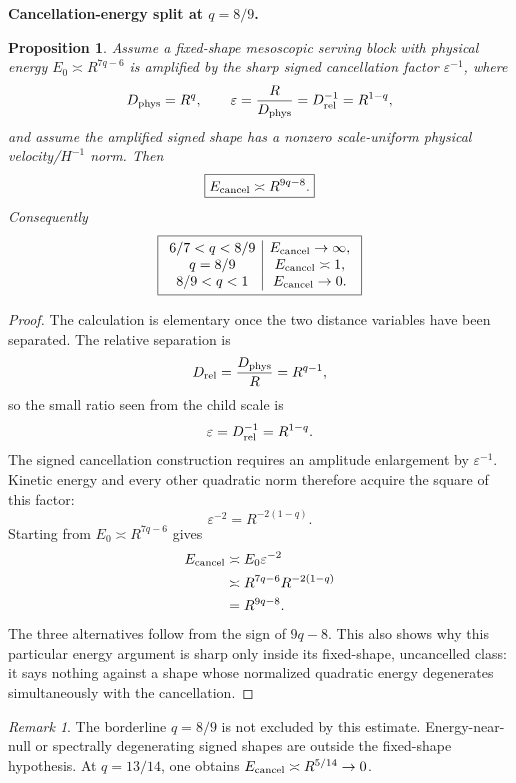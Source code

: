 \documentclass[11pt]{article}
\newtheorem{proposition}[theorem]{Proposition}
\theoremstyle{definition}\newtheorem{definition}[theorem]{Definition}
\theoremstyle{remark}\newtheorem{remark}[theorem]{Remark}
\begin{document}
\medskip
\noindent\textbf{Cancellation-energy split at $q=8/9$.}
\begin{proposition}\label{prop:q89}
Assume a fixed-shape mesoscopic serving block with physical energy
$E_0\asymp R^{7q-6}$ is amplified by the sharp signed cancellation factor
$\varepsilon^{-1}$, where
\[
D_{\rm phys}=R^q,\qquad
\varepsilon=\frac{R}{D_{\rm phys}}=D_{\rm rel}^{-1}=R^{1-q},
\]
and assume the amplified signed shape has a nonzero scale-uniform physical
velocity/$H^{-1}$ norm.  Then
\[
\boxed{E_{\rm cancel}\asymp R^{9q-8}.}
\]
Consequently
\[
\boxed{\begin{array}{c|c}
6/7<q<8/9&E_{\rm cancel}\to\infty,\\
q=8/9&E_{\rm cancel}\asymp1,\\
8/9<q<1&E_{\rm cancel}\to0.
\end{array}}
\]
\end{proposition}
\begin{proof}
The calculation is elementary once the two distance variables have been
separated.  The relative separation is
\[
 D_{\rm rel}=\frac{D_{\rm phys}}R=R^{q-1},
\]
so the small ratio seen from the child scale is
\[
 \varepsilon=D_{\rm rel}^{-1}=R^{1-q}.
\]
The signed cancellation construction requires an amplitude enlargement by
$\varepsilon^{-1}$.  Kinetic energy and every other quadratic norm therefore
acquire the square of this factor:
\[
 \varepsilon^{-2}=R^{-2(1-q)}.
\]
Starting from $E_0\asymp R^{7q-6}$ gives
\[
 \begin{aligned}
 E_{\rm cancel}
 &\asymp E_0\varepsilon^{-2}\\
 &\asymp R^{7q-6}R^{-2(1-q)}\\
 &=R^{9q-8}.
 \end{aligned}
\]
The three alternatives follow from the sign of $9q-8$.  This also shows why
this particular energy argument is sharp only inside its fixed-shape,
uncancelled class: it says nothing against a shape whose normalized quadratic
energy degenerates simultaneously with the cancellation.
\end{proof}
\begin{remark}
The borderline $q=8/9$ is not excluded by this estimate.  Energy-near-null or
spectrally degenerating signed shapes are outside the fixed-shape hypothesis.
At $q=13/14$, one obtains $E_{\rm cancel}\asymp R^{5/14}\to0$.
\end{remark}
\end{document}
